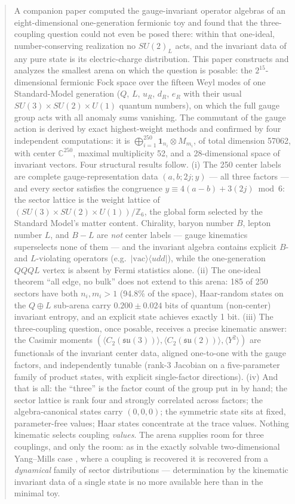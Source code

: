 \documentclass[11pt]{article}
\newcommand{\CC}{\mathbb{C}}
\newcommand{\ZZ}{\mathbb{Z}}
\newcommand{\su}[1]{\mathfrak{su}(#1)}
\begin{document}
\begin{abstract}
\sloppy A companion paper \cite{p2} computed the gauge-invariant operator algebras of an eight-dimensional one-generation fermionic toy and found that the three-coupling question could not even be posed there: within that one-ideal, number-conserving realization no $SU(2)_L$ acts, and the invariant data of any pure state is its electric-charge distribution. This paper constructs and analyzes the smallest arena on which the question is posable: the $2^{15}$-dimensional fermionic Fock space over the fifteen Weyl modes of one Standard-Model generation ($Q$, $L$, $u_R$, $d_R$, $e_R$ with their usual $SU(3)\times SU(2)\times U(1)$ quantum numbers), on which the full gauge group acts with all anomaly sums vanishing. The commutant of the gauge action is derived by exact highest-weight methods and confirmed by four independent computations: it is $\bigoplus_{i=1}^{250}\mathbf{1}_{n_i}\otimes M_{m_i}$, of total dimension 57062, with center $\CC^{250}$, maximal multiplicity 52, and a 28-dimensional space of invariant vectors. Four structural results follow. (i) The 250 center labels are complete gauge-representation data $(a,b;2j;y)$ --- all three factors --- and every sector satisfies the congruence $y \equiv 4(a-b)+3(2j) \bmod 6$: the sector lattice is the weight lattice of $(SU(3)\times SU(2)\times U(1))/\ZZ_6$, the global form selected by the Standard Model's matter content. Chirality, baryon number $B$, lepton number $L$, and $B-L$ are \emph{not} center labels --- gauge kinematics superselects none of them --- and the invariant algebra contains explicit $B$- and $L$-violating operators (e.g.\ $|\mathrm{vac}\rangle\langle udd|$), while the one-generation $QQQL$ vertex is absent by Fermi statistics alone. (ii) The one-ideal theorem ``all edge, no bulk'' does not extend to this arena: 185 of 250 sectors have both $n_i,m_i>1$ (94.8\% of the space), Haar-random states on the $Q\oplus L$ sub-arena carry $0.200\pm0.024$ bits of quantum (non-center) invariant entropy, and an explicit state achieves exactly 1 bit. (iii) The three-coupling question, once posable, receives a precise kinematic answer: the Casimir moments $(\langle C_2(\su3)\rangle, \langle C_2(\su2)\rangle, \langle Y^2\rangle)$ are functionals of the invariant center data, aligned one-to-one with the gauge factors, and independently tunable (rank-3 Jacobian on a five-parameter family of product states, with explicit single-factor directions). (iv) And that is all: the ``three'' is the factor count of the group put in by hand; the sector lattice is rank four and strongly correlated across factors; the algebra-canonical states carry $(0,0,0)$; the symmetric state sits at fixed, parameter-free values; Haar states concentrate at the trace values. Nothing kinematic selects coupling \emph{values}. The arena supplies room for three couplings, and only the room: as in the exactly solvable two-dimensional Yang--Mills case \cite{ym2}, where a coupling is recovered it is recovered from a \emph{dynamical} family of sector distributions --- determination by the kinematic invariant data of a single state is no more available here than in the minimal toy.
\end{abstract}
\end{document}
